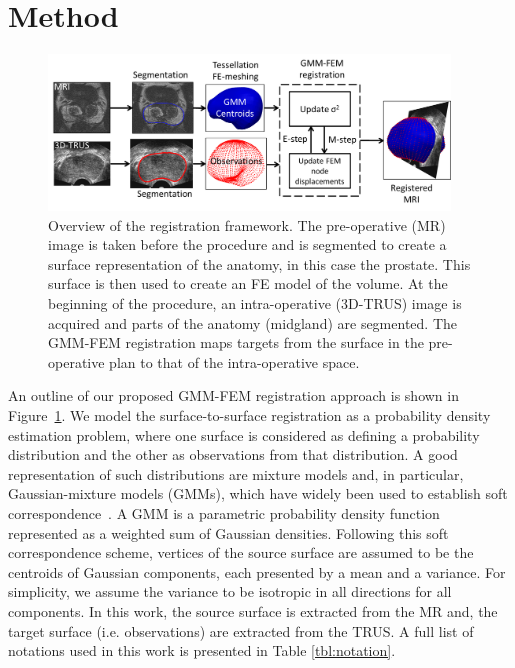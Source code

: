 \documentclass[journal]{IEEEtran}
\begin{document}
\section{Method}
\begin{figure}[t]
\center
\includegraphics[width = 0.95\textwidth]{flow1}
\caption{Overview of the registration framework. The pre-operative (MR) image is taken before the procedure and is segmented to create a surface representation of the anatomy, in this case the prostate. This surface is then used to create an FE model of the volume. At the beginning of the procedure, an intra-operative (3D-TRUS) image is acquired and parts of the anatomy (midgland) are segmented. The GMM-FEM registration maps targets from the surface in the pre-operative plan to that of the intra-operative space.}
\label{fig:flowchart}
\end{figure}
An outline of our proposed GMM-FEM registration approach is shown in Figure~\ref{fig:flowchart}. We model the surface-to-surface registration as a probability density estimation problem, where one surface is considered as defining a probability distribution and the other as observations from that distribution. A good representation of such distributions are mixture models and, in particular, Gaussian-mixture models (GMMs), which have widely been used to establish soft correspondence~\cite{Myronenko10a,Rasoulian12a,Jian11a}. A GMM is a parametric probability density function represented as a weighted sum of Gaussian densities.  Following this soft correspondence scheme, vertices of the source surface are assumed to be the centroids of Gaussian components, each presented by a mean and a variance. For simplicity, we assume the variance to be isotropic in all directions for all components.  In this work, the source surface is extracted from the MR and, the target surface (i.e. observations) are extracted from the TRUS.  A full list of notations used in this work is presented in Table \ref{tbl:notation}.
\end{document}
